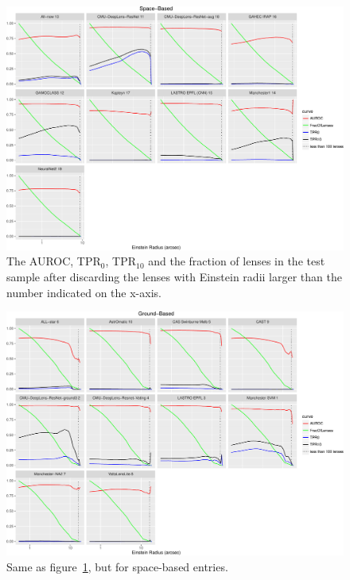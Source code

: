 \documentclass[useAMS,usenatbib]{mnras}
\begin{document}
\begin{figure}
 \includegraphics[width=2\columnwidth]{figures/einstein_space.pdf}
 \caption{The AUROC, TPR$_0$, TPR$_{10}$ and the fraction of lenses in the test sample after discarding the lenses with Einstein radii larger than the number indicated on the x-axis. }
 \label{fig:einstein_space}
\end{figure}

\begin{figure}
 \includegraphics[width=2\columnwidth]{figures/einstein_ground.pdf}
 \caption{Same as figure~\ref{fig:einstein_space}, but for space-based entries.}
 \label{fig:einstein_ground}
\end{figure}
\end{document}
